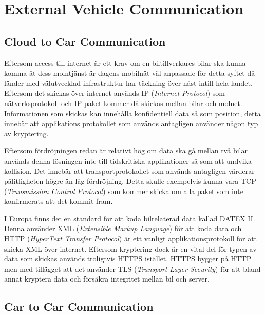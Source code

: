 \documentclass[a4paper]{IEEEtran}
\begin{document}
\section{External Vehicle Communication}
\subsection{Cloud to Car Communication}
Eftersom access till internet är ett krav om en biltillverkares bilar ska kunna komma åt dess molntjänst är dagens mobilnät väl anpassade för detta syftet då länder med välutvecklad infrastruktur har täckning över näst intill hela landet. 
Eftersom det skickas över internet används IP (\emph{Internet Protocol}) som nätverksprotokoll och IP-paket kommer då skickas mellan bilar och molnet. 
Informationen som skickas kan innehålla konfidentiell data så som position, detta innebär att applikations protokollet som används antagligen använder någon typ av kryptering.

Eftersom fördröjningen redan är relativt hög om data ska gå mellan två bilar används denna lösningen inte till tidskritiska applikationer så som att undvika kollision. 
Det innebär att transportprotokollet som används antagligen värderar pålitligheten högre än låg fördröjning. 
Detta skulle exempelvis kunna vara TCP (\emph{Transmission Control Protocol}) som kommer skicka om alla paket som inte konfirmerats att det kommit fram. \cite{TCP}

I Europa finns det en standard för att koda bilrelaterad data kallad DATEX \textrm{II}. 
Denna använder XML (\emph{Extensible Markup Language}) för att koda data och HTTP (\emph{HyperText Transfer Protocol}) är ett vanligt applikationsprotokoll för att skicka XML över  internet.
Eftersom kryptering dock är en vital del för typen av data som skickas används troligtvis HTTPS istället. 
HTTPS bygger på HTTP men med tillägget att det använder TLS (\emph{Transport Layer Security}) för att bland annat kryptera data och försäkra integritet mellan bil och server. \cite{DATEXII,HTTPS,TLS}

\subsection{Car to Car Communication}
\end{document}
